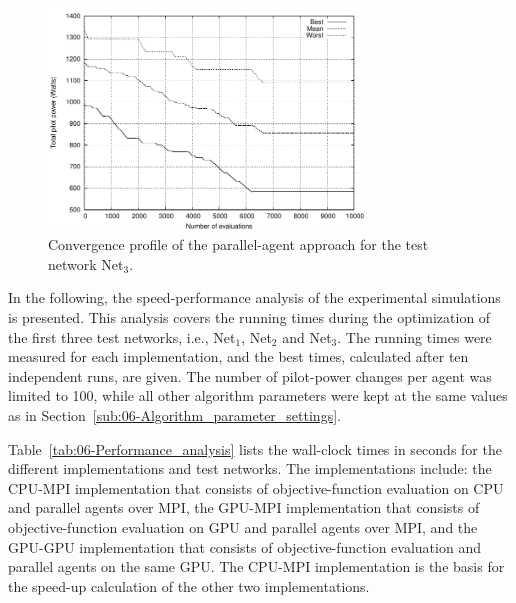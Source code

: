\begin{figure}
\centering

\includegraphics[width=0.75\textwidth]{06-experimental_evaluation-service_coverage/img/convergence_third}

\caption{Convergence profile of the parallel-agent approach for the test network
Net$_{3}$.\emph{\label{fig:06-Convergence_Net3}}}
\end{figure}


\bigskip{}


In the following, the speed-performance analysis of the experimental
simulations is presented. This analysis covers the running times during
the optimization of the first three test networks, i.e., Net$_{1}$,
Net$_{2}$ and Net$_{3}$. The running times were measured for each
implementation, and the best times, calculated after ten independent
runs, are given. The number of pilot-power changes per agent was limited
to 100, while all other algorithm parameters were kept at the same
values as in Section~\ref{sub:06-Algorithm_parameter_settings}.

Table~\ref{tab:06-Performance_analysis} lists the wall-clock times
in seconds for the different implementations and test networks. The
implementations include: the CPU-MPI implementation that consists
of objective-function evaluation on CPU and parallel agents over MPI,
the GPU-MPI implementation that consists of objective-function evaluation
on GPU and parallel agents over MPI, and the GPU-GPU implementation
that consists of objective-function evaluation and parallel agents
on the same GPU. The CPU-MPI implementation is the basis for the speed-up
calculation of the other two implementations.



